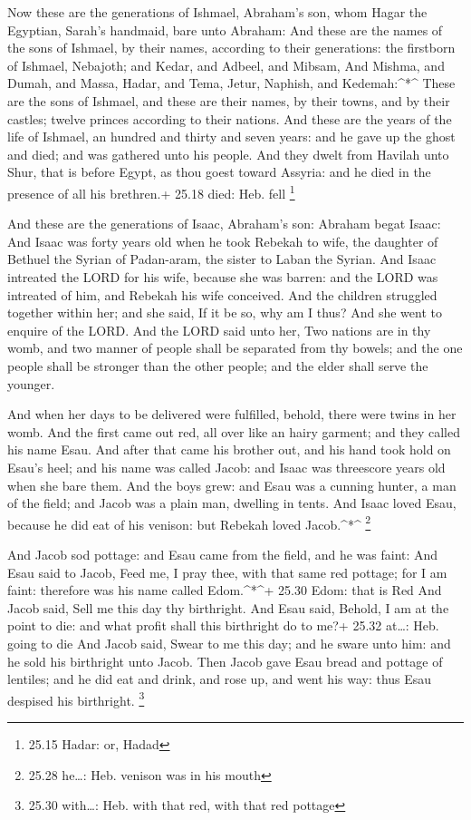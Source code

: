  Now these are the generations of Ishmael, Abraham's son,
whom Hagar the Egyptian, Sarah's handmaid, bare unto Abraham:
 And these are the names of the sons of Ishmael, by their
names, according to their generations: the firstborn of Ishmael,
Nebajoth; and Kedar, and Adbeel, and Mibsam,  And Mishma,
and Dumah, and Massa,  Hadar, and Tema, Jetur, Naphish, and
Kedemah:\^{}*\^{}  These are the sons of Ishmael, and these
are their names, by their towns, and by their castles; twelve princes
according to their nations.  And these are the years of the
life of Ishmael, an hundred and thirty and seven years: and he gave up
the ghost and died; and was gathered unto his people.  And
they dwelt from Havilah unto Shur, that is before Egypt, as thou goest
toward Assyria: and he died in the presence of all his brethren.+ 25.18
died: Heb. fell \footnote{25.15 Hadar: or, Hadad}

 And these are the generations of Isaac, Abraham's son:
Abraham begat Isaac:  And Isaac was forty years old when he
took Rebekah to wife, the daughter of Bethuel the Syrian of Padan-aram,
the sister to Laban the Syrian.  And Isaac intreated the
LORD for his wife, because she was barren: and the LORD was intreated of
him, and Rebekah his wife conceived.  And the children
struggled together within her; and she said, If it be so, why am I thus?
And she went to enquire of the LORD.  And the LORD said
unto her, Two nations are in thy womb, and two manner of people shall be
separated from thy bowels; and the one people shall be stronger than the
other people; and the elder shall serve the younger.

 And when her days to be delivered were fulfilled, behold,
there were twins in her womb.  And the first came out red,
all over like an hairy garment; and they called his name Esau.
 And after that came his brother out, and his hand took
hold on Esau's heel; and his name was called Jacob: and Isaac was
threescore years old when she bare them.  And the boys
grew: and Esau was a cunning hunter, a man of the field; and Jacob was a
plain man, dwelling in tents.  And Isaac loved Esau,
because he did eat of his venison: but Rebekah loved Jacob.\^{}*\^{}
\footnote{25.28 he\ldots: Heb. venison was in his mouth}

 And Jacob sod pottage: and Esau came from the field, and
he was faint:  And Esau said to Jacob, Feed me, I pray
thee, with that same red pottage; for I am faint: therefore was his name
called Edom.\^{}*\^{}+ 25.30 Edom: that is Red  And Jacob
said, Sell me this day thy birthright.  And Esau said,
Behold, I am at the point to die: and what profit shall this birthright
do to me?+ 25.32 at\ldots: Heb. going to die  And Jacob
said, Swear to me this day; and he sware unto him: and he sold his
birthright unto Jacob.  Then Jacob gave Esau bread and
pottage of lentiles; and he did eat and drink, and rose up, and went his
way: thus Esau despised his birthright. \footnote{25.30 with\ldots: Heb.
  with that red, with that red pottage}

